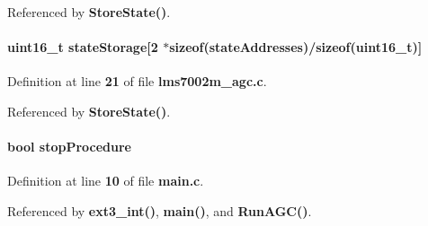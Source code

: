Referenced by {\bf Store\+State()}.

\paragraph[{state\+Storage}]{\setlength{\rightskip}{0pt plus 5cm}uint16\+\_\+t state\+Storage[2 $\ast$sizeof({\bf state\+Addresses})/sizeof(uint16\+\_\+t)]\hspace{0.3cm}{\ttfamily [static]}}\label{lms7002m__agc_8c_a5df9762674f1a4cd02705230f095a15e}


Definition at line {\bf 21} of file {\bf lms7002m\+\_\+agc.\+c}.



Referenced by {\bf Store\+State()}.

\paragraph[{stop\+Procedure}]{\setlength{\rightskip}{0pt plus 5cm}bool stop\+Procedure}\label{lms7002m__agc_8c_a9892bd020ffd46c1744bbbf4d78346a5}


Definition at line {\bf 10} of file {\bf main.\+c}.



Referenced by {\bf ext3\+\_\+int()}, {\bf main()}, and {\bf Run\+A\+G\+C()}.

